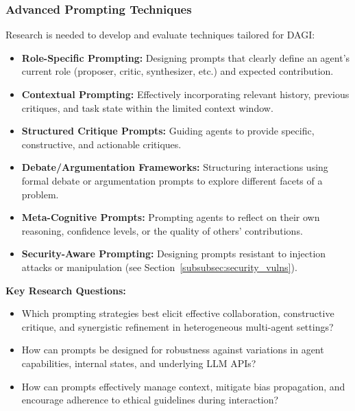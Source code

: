 \documentclass[12pt]{amsart}
\begin{document}
\subsubsection{Advanced Prompting Techniques}
\label{subsubsec:advanced_prompting}
Research is needed to develop and evaluate techniques tailored for DAGI:
\begin{itemize}[leftmargin=*]
    \item \textbf{Role-Specific Prompting:} Designing prompts that clearly define an agent's current role (proposer, critic, synthesizer, etc.) and expected contribution.
    \item \textbf{Contextual Prompting:} Effectively incorporating relevant history, previous critiques, and task state within the limited context window.
    \item \textbf{Structured Critique Prompts:} Guiding agents to provide specific, constructive, and actionable critiques.
    \item \textbf{Debate/Argumentation Frameworks:} Structuring interactions using formal debate or argumentation prompts to explore different facets of a problem.
    \item \textbf{Meta-Cognitive Prompts:} Prompting agents to reflect on their own reasoning, confidence levels, or the quality of others' contributions.
    \item \textbf{Security-Aware Prompting:} Designing prompts resistant to injection attacks or manipulation (see Section~\ref{subsubsec:security_vulns}).
\end{itemize}
\textbf{Key Research Questions:}
\begin{itemize}[leftmargin=*, label={--}]
    \item Which prompting strategies best elicit effective collaboration, constructive critique, and synergistic refinement in heterogeneous multi-agent settings?
    \item How can prompts be designed for robustness against variations in agent capabilities, internal states, and underlying LLM APIs?
    \item How can prompts effectively manage context, mitigate bias propagation, and encourage adherence to ethical guidelines during interaction?
\end{itemize}
\end{document}
